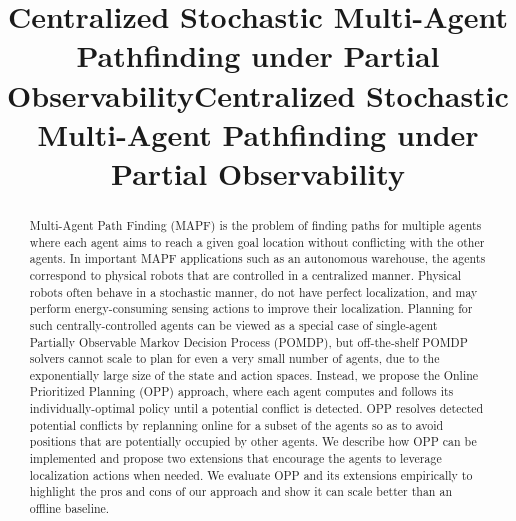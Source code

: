 \documentclass[letterpaper]{article} %
\title{Centralized Stochastic Multi-Agent Pathfinding under Partial Observability}
\begin{document}
\maketitle

\title{Centralized Stochastic Multi-Agent Pathfinding under Partial Observability}



\begin{abstract}
Multi-Agent Path Finding (MAPF) is the problem of finding paths for multiple agents where each agent aims to reach a given goal location without conflicting with the other agents. 
In important MAPF applications such as an autonomous warehouse, 
the agents correspond to physical robots that are controlled in a centralized manner. 
Physical robots often behave in a stochastic manner, do not have perfect localization, and may perform energy-consuming sensing actions to improve their localization. 
Planning for such centrally-controlled agents can be viewed as a special case of single-agent Partially Observable Markov Decision Process (POMDP), but off-the-shelf POMDP solvers cannot scale to plan for even a very small number of agents, due to the exponentially large size of the state and action spaces.  
Instead, we propose the Online Prioritized Planning (OPP) approach, where each agent computes and follows its individually-optimal policy until a potential conflict is detected. 
OPP resolves detected potential conflicts by replanning online for a subset of the agents so as to avoid positions that are potentially occupied by other agents. 
We describe how OPP can be implemented and propose two extensions that encourage the agents to leverage localization actions when needed. 
We evaluate OPP and its extensions empirically to highlight the pros and cons of our approach and show it can scale better than an offline baseline.
\end{abstract}


\end{document}
